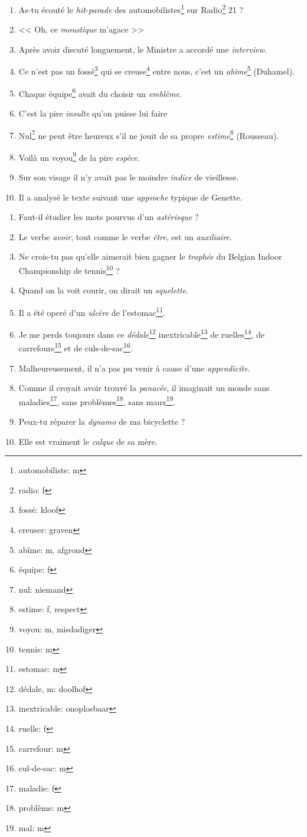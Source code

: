 \documentclass[11pt, french]{report}
\begin{document}
\begin{enumerate}
\item As-tu écouté le \textit{hit-parade} des automobilistes\footnote{automobiliste: m} sur Radio\footnote{radio: f} 21 ?
\item << Oh, ce \textit{moustique} m'agace >>
\item Après avoir discuté longuement, le Ministre a accordé une \textit{interview}.
\item Ce n'est pas un fossé\footnote{fossé: kloof} qui se creuse\footnote{creuser: graven} entre nous, c'est un \textit{abîme}\footnote{abîme: m, afgrond} (Duhamel).
\item Chaque équipe\footnote{équipe: f} avait du choisir un \textit{emblème}.
\item C'est la pire \textit{insulte} qu'on puisse lui faire
\item Nul\footnote{nul: niemand} ne peut être heureux s'il ne jouit de sa propre \textit{estime}\footnote{estime: f, respect} (Rousseau).
\item Voilà un voyou\footnote{voyou: m, misdadiger} de la pire \textit{espèce}.
\item Sur son visage il n'y avait pas le moindre \textit{indice} de vieillesse.
\item Il a analysé  le texte suivant une \textit{approche} typique de Genette.
\end{enumerate}

\vfill

\begin{enumerate}
\item Faut-il étudier les mots pourvus d'un \textit{astérisque} ?
\item Le verbe \textit{avoir}, tout comme le verbe \textit{être}, est un \textit{auxiliaire}.
\item Ne crois-tu pas qu'elle aimerait bien gagner le \textit{trophée} du Belgian Indoor Championship de tennis\footnote{tennis: m} ?
\item Quand on la voit courir, on dirait un \textit{squelette}.
\item Il a été operé d'un \textit{ulcère} de l'estomac\footnote{estomac: m}.
\item Je me perds toujours dans ce \textit{dédale}\footnote{dédale, m: doolhof} inextricable\footnote{inextricable: onoplosbaar} de ruelles\footnote{ruelle: f}, de carrefours\footnote{carrefour: m} et de culs-de-sac\footnote{cul-de-sac: m}.
\item Malheureusement, il n'a pas pu venir à cause d'une \textit{appendicite}.
\item Comme il croyait avoir trouvé la \textit{panacée}, il imaginait un monde sans maladies\footnote{maladie: f}, sans problèmes\footnote{problème: m}, sans maux\footnote{mal: m}.
\item Peux-tu réparer la \textit{dynamo} de ma bicyclette ?
\item Elle est vraiment le \textit{calque} de sa mère.
\end{enumerate}
\end{document}
